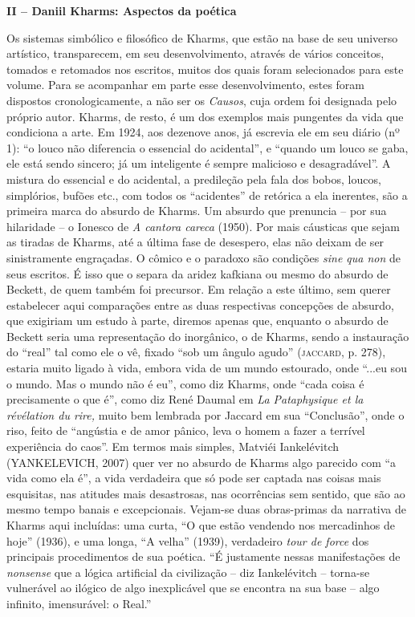 \textbf{II -- Daniil Kharms: Aspectos da poética}

Os sistemas simbólico e filosófico de Kharms, que estão na base de seu
universo artístico, transparecem, em seu desenvolvimento, através de
vários conceitos, tomados e retomados nos escritos, muitos dos quais
foram selecionados para este volume. Para se acompanhar em parte esse
desenvolvimento, estes foram dispostos cronologicamente, a não ser os
\emph{Causos}, cuja ordem foi designada pelo próprio autor. Kharms, de
resto, é um dos exemplos mais pungentes da vida que condiciona a arte.
Em 1924, aos dezenove anos, já escrevia ele em seu diário (nº 1): ``o
louco não diferencia o essencial do acidental'', e ``quando um louco se
gaba, ele está sendo sincero; já um inteligente é sempre malicioso e
desagradável''. A mistura do essencial e do acidental, a predileção pela
fala dos bobos, loucos, simplórios, bufões etc., com todos os
``acidentes'' de retórica a ela inerentes, são a primeira marca do
absurdo de Kharms. Um absurdo que prenuncia -- por sua hilaridade -- o
Ionesco de \emph{A cantora careca} (1950). Por mais cáusticas que sejam
as tiradas de Kharms, até a última fase de desespero, elas não deixam de
ser sinistramente engraçadas. O cômico e o paradoxo são condições
\emph{sine qua non} de seus escritos. É isso que o separa da aridez
kafkiana ou mesmo do absurdo de Beckett, de quem também foi precursor.
Em relação a este último, sem querer estabelecer aqui comparações entre
as duas respectivas concepções de absurdo, que exigiriam um estudo à
parte, diremos apenas que, enquanto o absurdo de Beckett seria uma
representação do inorgânico, o de Kharms, sendo a instauração do
``real'' tal como ele o vê, fixado ``sob um ângulo agudo''
(\textsc{jaccard}, p. 278), estaria muito ligado à vida, embora vida de
um mundo estourado, onde ``...eu sou o mundo. Mas o mundo não é eu'',
como diz Kharms, onde ``cada coisa é precisamente o que é'', como diz
René Daumal em \emph{La Pataphysique et la révélation du rire,} muito
bem lembrada por Jaccard em sua ``Conclusão'', onde o riso, feito de
``angústia e de amor pânico, leva o homem a fazer a terrível experiência
do caos''. Em termos mais simples, Matviéi Iankelévitch (YANKELEVICH,
2007) quer ver no absurdo de Kharms algo parecido com ``a vida como ela
é'', a vida verdadeira que só pode ser captada nas coisas mais
esquisitas, nas atitudes mais desastrosas, nas ocorrências sem sentido,
que são ao mesmo tempo banais e excepcionais. Vejam-se duas obras-primas
da narrativa de Kharms aqui incluídas: uma curta, ``O que estão vendendo
nos mercadinhos de hoje'' (1936), e uma longa, ``A velha'' (1939),
verdadeiro \emph{tour de force} dos principais procedimentos de sua
poética. ``É justamente nessas manifestações de \emph{nonsense} que a
lógica artificial da civilização -- diz Iankelévitch -- torna-se
vulnerável ao ilógico de algo inexplicável que se encontra na sua base
-- algo infinito, imensurável: o Real.''

